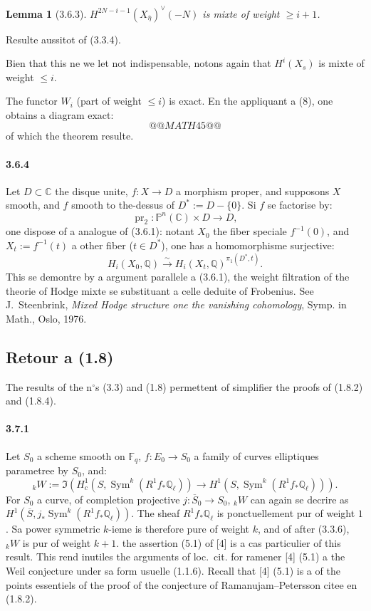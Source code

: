 \documentclass[12pt,a4paper]{article}
\theoremstyle{plain}
\newtheorem{lemma}[theorem]{Lemma}
\theoremstyle{definition}
\theoremstyle{remark}
\DeclareMathOperator{\Sym}{Sym}
\DeclareMathOperator{\pr}{pr}
\newcommand{\CC}{{\mathbb{C}}}
\newcommand{\FF}{{\mathbb{F}}}
\newcommand{\QQ}{{\mathbb{Q}}}
\newcommand{\PP}{{\mathbb{P}}}
\begin{document}
\begin{lemma}[3.6.3]
$H^{2N-i-1}(X_{\overline{\eta}})^\vee(-N)$ is mixte of weight $\geq i + 1$.
\end{lemma}

Resulte aussitot of (3.3.4).

Bien that this ne we let not indispensable, notons again that $H^i(X_s)$ is mixte of weight $\leq i$.

The functor $W_i$ (part of weight $\leq i$) is exact. En the appliquant a (8), one obtains a diagram exact:
\[
@@MATH45@@
\]
of which the theorem resulte.

\paragraph{3.6.4}
Let $D \subset \CC$ the disque unite, $f : X \to D$ a morphism proper, and supposons $X$ smooth, and $f$ smooth to the-dessus of $D^* := D - \{0\}$. Si $f$ se factorise by:
\[ \pr_2 : \PP^n(\CC) \times D \to D, \]
one dispose of a analogue of (3.6.1): notant $X_0$ the fiber speciale $f^{-1}(0)$, and $X_t := f^{-1}(t)$ a other fiber ($t \in D^*$), one has a homomorphisme surjective:
\[ H_i(X_0, \QQ) \xrightarrow{\sim} H_i(X_t, \QQ)^{\pi_1(D^*, t)}. \]
This se demontre by a argument parallele a (3.6.1), the weight filtration of the theorie of Hodge mixte se substituant a celle deduite of Frobenius. See J.~Steenbrink, \textit{Mixed Hodge structure one the vanishing cohomology}, Symp. in Math., Oslo, 1976.



\subsection{Retour a (1.8)}

The results of the n$^\circ$s (3.3) and (1.8) permettent of simplifier the proofs of (1.8.2) and (1.8.4).

\paragraph{3.7.1}
Let $S_0$ a scheme smooth on $\FF_q$, $f : E_0 \to S_0$ a family of curves elliptiques parametree by $S_0$, and:
\[ {}_k W := \Im(H_c^1(S, \Sym^k(R^1 f_* \QQ_\ell)) \to H^1(S, \Sym^k(R^1 f_* \QQ_\ell))). \]
For $S_0$ a curve, of completion projective $j : \overline{S}_0 \to S_0$, ${}_k W$ can again se decrire as $H^1(\overline{S}, j_* \Sym^k(R^1 f_* \QQ_\ell))$. The sheaf $R^1 f_* \QQ_\ell$ is ponctuellement pur of weight $1$. Sa power symmetric $k$-ieme is therefore pure of weight $k$, and of after (3.3.6), ${}_k W$ is pur of weight $k + 1$. the assertion (5.1) of [4] is a cas particulier of this result. This rend inutiles the arguments of loc.~cit. for ramener [4] (5.1) a the Weil conjecture under sa form usuelle (1.1.6). Recall that [4] (5.1) is a of the points essentiels of the proof of the conjecture of Ramanujam--Petersson citee en (1.8.2).
\end{document}

